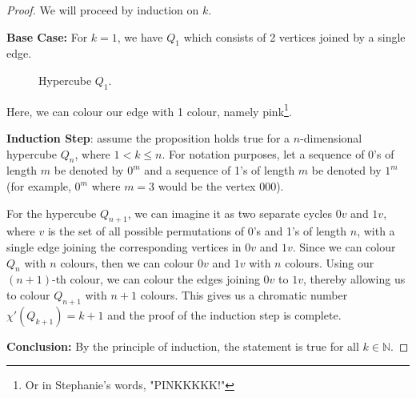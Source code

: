 \documentclass[11pt, oneside]{article}   	%
\begin{document}
\begin{proof}

We will proceed by induction on $k$.

\textbf{Base Case:} For $k=1$, we have $Q_1$ which consists of 2 vertices joined by a single edge.

\begin{figure}[h]           
            \centering
            \caption{Hypercube $Q_1$.}
            \label{Q1}
\end{figure}
Here, we can colour our edge with 1 colour, namely pink\footnote{Or in Stephanie's words, "PINKKKKK!"}.

\textbf{Induction Step}: assume the proposition holds true for a $n$-dimensional hypercube $Q_n$, where $1 < k \leq n$. For notation purposes, let a sequence of 0's of length $m$ be denoted by $0^m$ and a sequence of 1's of length $m$ be denoted by $1^m$ (for example, $0^m$ where $m=3$ would be the vertex 000). 

For the hypercube $Q_{n+1}$, we can imagine it as two separate cycles $0v$ and $1v$, where $v$ is the set of all possible permutations of 0's and 1's of length $n$, with a single edge joining the corresponding vertices in $0v$ and $1v$. Since we can colour $Q_n$ with $n$ colours, then we can colour $0v$ and $1v$ with $n$ colours. Using our $(n+1)$-th colour, we can colour the edges joining $0v$ to $1v$, thereby allowing us to colour $Q_{n+1}$ with $n+1$ colours. This gives us a chromatic number $\chi'(Q_{k+1}) = k+1$ and the proof of the induction step is complete.

\textbf{Conclusion:} By the principle of induction,  the statement is true for all $k \in \mathbb{N}$.
	
\end{proof}
\end{document}
